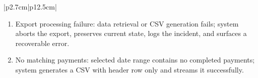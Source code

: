 \begin{table}[H]
\begin{tabular}{|p{2.7cm}|p{12.5cm}|}
\begin{minipage}[t]{\linewidth}
\begin{enumerate}[topsep=0pt,itemsep=1pt,parsep=0pt,partopsep=0pt]
                \item Export processing failure: data retrieval or CSV generation fails; system aborts the export, preserves current state, logs the incident, and surfaces a recoverable error.
                \item No matching payments: selected date range contains no completed payments; system generates a CSV with header row only and streams it successfully.
            \end{enumerate}
        \end{minipage} \\ 
        \hline
    \end{tabular}
    \label{tab:teacher-export-earnings}
\end{table}















\iffalse

